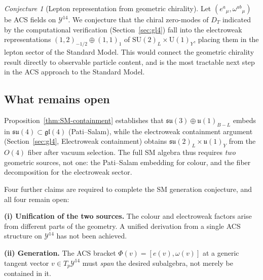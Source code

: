 \documentclass[11pt,a4paper]{article}
\theoremstyle{plain}
\theoremstyle{definition}
\theoremstyle{remark}
\newtheorem{conjecture}[theorem]{Conjecture}
\begin{document}
\begin{conjecture}[Lepton representation from geometric chirality]
\label{conj:lepton}
Let $(e^a{}_\mu, \omega^{ab}{}_\mu)$ be ACS fields on $\mathcal{Y}^{14}$.
We conjecture that the chiral zero-modes of $D_T$ indicated by the
computational verification (Section~\ref{sec:gl4}) fall into the electroweak representations
$(1,2)_{-1/2} \oplus (1,1)_1$ of $\mathrm{SU}(2)_L \times \mathrm{U}(1)_Y$,
placing them in the lepton sector of the Standard Model.
This would connect the geometric chirality result directly to
observable particle content, and is the most tractable next step
in the ACS approach to the Standard Model.
\end{conjecture}

\subsection{What remains open}

Proposition~\ref{thm:SM-containment} establishes that $\mathfrak{su}(3) \oplus \mathfrak{u}(1)_{B-L}$
embeds in $\mathfrak{su}(4) \subset \mathfrak{gl}(4)$ (Pati--Salam), while the electroweak 
containment argument (Section~\ref{sec:gl4}, Electroweak containment) obtains 
$\mathfrak{su}(2)_L \times \mathfrak{u}(1)_Y$ from the $O(4)$ fiber after vacuum selection.
The full SM algebra thus requires \emph{two} geometric sources, not one:
the Pati--Salam embedding for colour, and the fiber decomposition for the electroweak sector.

Four further claims are required to complete the SM generation
conjecture, and all four remain open:

\medskip
\noindent\textbf{(i) Unification of the two sources.}
The colour and electroweak factors arise from different parts of the geometry.
A unified derivation from a single ACS structure on $\mathcal{Y}^{14}$ has not been achieved.

\medskip
\noindent\textbf{(ii) Generation.}  
The ACS bracket $\Phi(v) = [e(v), \omega(v)]$ at a generic tangent vector 
$v \in T_p\mathcal{Y}^{14}$ must \emph{span} the desired subalgebra, 
not merely be contained in it.
\end{document}
